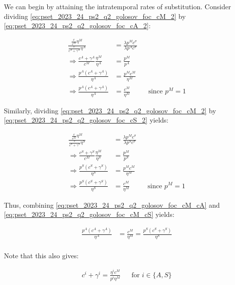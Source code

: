 We can begin by attaining the intratemporal rates of substitution.
Consider dividing \eqref{eq:pset_2023_24_ps2_q2_golosov_foc_cM_2} by \eqref{eq:pset_2023_24_ps2_q2_golosov_foc_cA_2}:

\begin{align}
    \frac{\frac{c}{c^M} \eta^M}{\frac{c}{c^A+\gamma^A} \eta^A} &= \frac{\lambda p^M c^{\sigma}}{\lambda p^A c^{\sigma}} \\
    \Rightarrow \frac{c^A+\gamma^A}{c^M} \frac{\eta^M}{\eta^A} &= \frac{p^M}{p^A}  \\
    \Rightarrow \frac{p^A (c^A + \gamma^A)}{\eta^A} &= \frac{p^M c^M}{\eta^M} \\
    \Rightarrow \frac{p^A (c^A + \gamma^A)}{\eta^A} &= \frac{c^M}{\eta^M} && \text{since $p^M =1$} \label{eq:pset_2023_24_ps2_q2_golosov_foc_cM_cA}
\end{align}

Similarly, dividing \eqref{eq:pset_2023_24_ps2_q2_golosov_foc_cM_2} by \eqref{eq:pset_2023_24_ps2_q2_golosov_foc_cS_2} yields:

\begin{align}
    \frac{\frac{c}{c^M} \eta^M}{\frac{c}{c^S+\gamma^S} \eta^S} &= \frac{\lambda p^M c^{\sigma}}{\lambda p^S c^{\sigma}} \\
    \Rightarrow \frac{c^S+\gamma^S}{c^M} \frac{\eta^M}{\eta^S} &= \frac{p^M}{p^S}  \\
    \Rightarrow \frac{p^S (c^S + \gamma^S)}{\eta^S} &= \frac{p^M c^M}{\eta^M} \\
    \Rightarrow \frac{p^S (c^S + \gamma^S)}{\eta^S} &= \frac{c^M}{\eta^M} && \text{since $p^M =1$} \label{eq:pset_2023_24_ps2_q2_golosov_foc_cM_cS}
\end{align}

Thus, combining \eqref{eq:pset_2023_24_ps2_q2_golosov_foc_cM_cA} and \eqref{eq:pset_2023_24_ps2_q2_golosov_foc_cM_cS} yields:

\begin{align}
    \frac{p^A (c^A + \gamma^A)}{\eta^A} &= \frac{c^M}{\eta^M} = \frac{p^S (c^S + \gamma^S)}{\eta^S} \\
\end{align}

Note that this also gives:

\begin{align}
    c^i + \gamma^i = \frac{\eta^i c^M}{p^i \eta^M} && \text{for $i \in \{A, S\}$} \label{eq:pset_2023_24_ps2_q2_golosov_itr}
\end{align}

